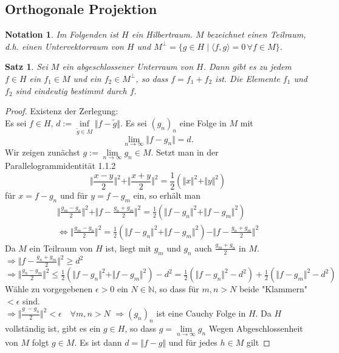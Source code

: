 \documentclass[12pt,titlepage]{article}
\newtheorem{satz}[zahl]{Satz}
\numberwithin{equation}{section}
\newtheorem{notation}[zahl]{Notation}
\begin{document}
\subsection{Orthogonale Projektion}
\begin{notation}
Im Folgenden ist $H$ ein Hilbertraum. $M$ bezeichnet einen Teilraum, d.h. einen Untervektorraum von $H$ und $M^{\perp}=\{g\in H \mid \langle f,g\rangle=0 \,\forall f \in M\}$.
\end{notation}
\begin{satz}
Sei $M$ ein abgeschlossener Unterraum von $H$. Dann gibt es zu jedem $f\in H$ ein $f_1\in M$ und ein $f_2\in M^{\perp}$, so dass $f=f_1+f_2$ ist. Die Elemente $f_1$ und $f_2$ sind eindeutig bestimmt durch $f$.
\end{satz}
\begin{proof}
Existenz der Zerlegung:\\
Es sei $f \in H$, $d:=\underset{\tilde{g}\in M}{\inf}\Vert f-\tilde{g}\Vert$. Es sei $(g_n)_n$ eine Folge in $M$ mit 
\[
\underset{n \rightarrow \infty}{\lim}\Vert f-g_n\Vert =d. 
\]
Wir zeigen zunächst $g:=\underset{n \rightarrow \infty}{\lim}g_n \in M$. Setzt man in der Parallelogrammidentität 1.1.2
\[
\Vert\frac{x-y}{2} \Vert^2+\Vert \frac{x+y}{2}\Vert^2=\frac{1}{2}(\Vert x\Vert^2+\Vert y\Vert^2)
\]
für $x=f-g_n$ und für $y=f-g_m$ ein, so erhält man
\begin{align*}
\Vert\frac{g_m-g_n}{2} \Vert^2+\Vert f-\frac{g_n+g_m}{2}\Vert^2=\frac{1}{2}(\Vert f-g_n\Vert^2+\Vert f-g_m\Vert^2)\\
\Leftrightarrow  \Vert\frac{g_m-g_n}{2} \Vert^2=\frac{1}{2}(\Vert f-g_n\Vert^2+\Vert f-g_m\Vert^2)-\Vert f-\frac{g_n+g_m}{2}\Vert^2
\end{align*}
Da $M$ ein Teilraum von $H$ ist, liegt mit $g_m$ und $g_n$ auch $\frac{g_m+g_n}{2}$ in $M$.\\
$\Rightarrow \Vert f-\frac{g_n+g_m}{2}\Vert^2 \geq d^2$\\
$\Rightarrow \Vert \frac{g_n-g_m}{2}\Vert^2 \leq \frac{1}{2}(\Vert f-g_n\Vert^2+\Vert f-g_m\Vert^2)-d^2 =\frac{1}{2}(\Vert f-g_n\Vert^2-d^2)+\frac{1}{2}(\Vert f-g_m\Vert^2-d^2)$\\
Wähle zu vorgegebenen $\epsilon > 0$ ein $N \in \mathbb{N}$, so dass für $m,n>N$ beide "Klammern" $< \epsilon$ sind.\\
$\Rightarrow \Vert \frac{g_,-g_n}{2} \Vert^2< \epsilon \quad \forall m,n >N$
$\Rightarrow (g_n)_n$ ist eine Cauchy Folge in $H$. Da $H$ vollständig ist, gibt es ein $g\in H$, so dass $g=\underset{n \rightarrow \infty}{\lim} g_n$ Wegen Abgeschlossenheit von $M$ folgt $g\in M.$ Es ist dann $d=\Vert f-g \Vert $ und für jedes $h\in M$ gilt 

\end{proof}
\end{document}
